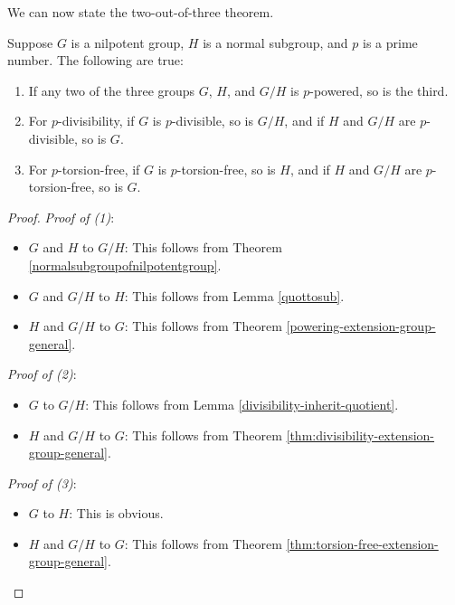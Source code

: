 \documentclass{ucetd}
\begin{document}
We can now state the two-out-of-three theorem.

\begin{theorem}\label{thm:two-out-of-three}
  Suppose $G$ is a nilpotent group, $H$ is a normal subgroup, and $p$
  is a prime number. The following are true:

  \begin{enumerate}
  \item If any two of the three groups $G$, $H$, and $G/H$ is
    $p$-powered, so is the third.
  \item For $p$-divisibility, if $G$ is $p$-divisible, so is $G/H$,
    and if $H$ and $G/H$ are $p$-divisible, so is $G$.
  \item For $p$-torsion-free, if $G$ is $p$-torsion-free, so is $H$,
    and if $H$ and $G/H$ are $p$-torsion-free, so is $G$.
  \end{enumerate}
\end{theorem}

\begin{proof}
  {\em Proof of (1)}:

  \begin{itemize}
  \item $G$ and $H$ to $G/H$: This follows from Theorem
    \ref{normalsubgroupofnilpotentgroup}.
  \item $G$ and $G/H$ to $H$: This follows from Lemma \ref{quottosub}.
  \item $H$ and $G/H$ to $G$: This follows from Theorem
    \ref{powering-extension-group-general}.
  \end{itemize}

  {\em Proof of (2)}:

  \begin{itemize}
  \item $G$ to $G/H$: This follows from Lemma \ref{divisibility-inherit-quotient}.
  \item $H$ and $G/H$ to $G$: This follows from Theorem \ref{thm:divisibility-extension-group-general}.
  \end{itemize}

  {\em Proof of (3)}:

  \begin{itemize}
  \item $G$ to $H$: This is obvious.
  \item $H$ and $G/H$ to $G$: This follows from Theorem \ref{thm:torsion-free-extension-group-general}.
  \end{itemize}
\end{proof}
\end{document}
